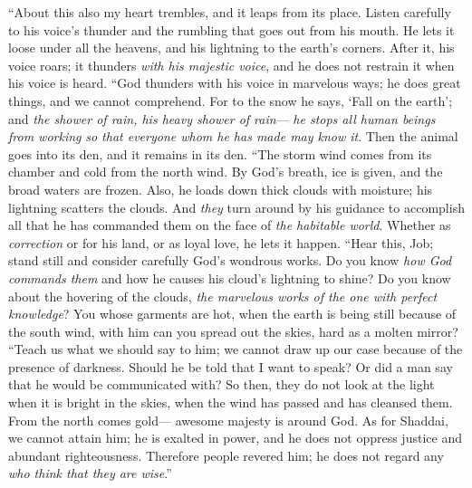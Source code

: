 \begin{biblechapter} %
 “About this also my heart trembles, 
and it leaps from its place.
\verse Listen carefully to his voice’s thunder 
and the rumbling that goes out from his mouth.
\verse He lets it loose under all the heavens, 
and his lightning to the earth’s corners.
\verse After it, his voice roars; 
it thunders \textit{with his majestic voice}, 
and he does not restrain it when his voice is heard.
\verse “God thunders with his voice in marvelous ways; 
he does great things, and we cannot comprehend.
\verse For to the snow he says, ‘Fall on the earth’; 
and \textit{the shower of rain, his heavy shower of rain}—
\verse \textit{he stops all human beings from working} 
\textit{so that everyone whom he has made may know it}.
\verse Then the animal goes into its den, 
and it remains in its den.
\verse “The storm wind comes from its chamber 
and cold from the north wind.
\verse By God’s breath, ice is given, 
and the broad waters are frozen.
\verse Also, he loads down thick clouds with moisture; 
his lightning scatters the clouds.
\verse And \textit{they} turn around by his guidance 
to accomplish all that he has commanded them 
on the face of \textit{the habitable world}.
\verse Whether as \textit{correction} or for his land, 
or as loyal love, he lets it happen.
\verse “Hear this, Job; 
stand still and consider carefully God’s wondrous works.
\verse Do you know \textit{how God commands them} 
and how he causes his cloud’s lightning to shine?
\verse Do you know about the hovering of the clouds, 
\textit{the marvelous works of the one with perfect knowledge}?
\verse You whose garments are hot, 
when the earth is being still because of the south wind,
\verse with him can you spread out the skies, 
hard as a molten mirror?
\verse “Teach us what we should say to him; 
we cannot draw up our case because of the presence of darkness.
\verse Should he be told that I want to speak? 
Or did a man say that he would be communicated with?
\verse So then, they do not look at the light when it is bright in the skies, 
when the wind has passed and has cleansed them.
\verse From the north comes gold— 
awesome majesty is around God.
\verse As for Shaddai, we cannot attain him; 
he is exalted in power, 
and he does not oppress justice and abundant righteousness.
\verse Therefore people revered him; 
he does not regard any \textit{who think that they are wise}.”
\end{biblechapter}

